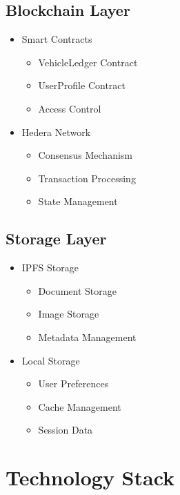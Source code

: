 \documentclass[12pt,a4paper]{article}
\begin{document}
    \subsection{Blockchain Layer}
    \begin{itemize}
        \item Smart Contracts
        \begin{itemize}
            \item VehicleLedger Contract
            \item UserProfile Contract
            \item Access Control
        \end{itemize}

        \item Hedera Network
        \begin{itemize}
            \item Consensus Mechanism
            \item Transaction Processing
            \item State Management
        \end{itemize}
    \end{itemize}

    \subsection{Storage Layer}
    \begin{itemize}
        \item IPFS Storage
        \begin{itemize}
            \item Document Storage
            \item Image Storage
            \item Metadata Management
        \end{itemize}

        \item Local Storage
        \begin{itemize}
            \item User Preferences
            \item Cache Management
            \item Session Data
        \end{itemize}
    \end{itemize}


    \section{Technology Stack}
\end{document}
